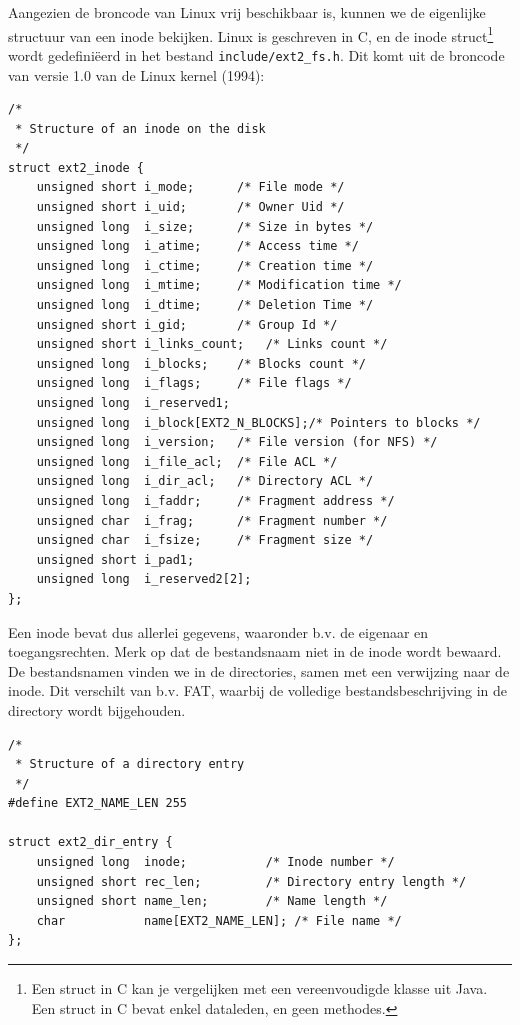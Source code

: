 Aangezien de broncode van Linux vrij beschikbaar is, kunnen we de eigenlijke structuur van een inode
bekijken. Linux is geschreven in C, en de inode struct\footnote{Een struct in C kan je vergelijken
met een vereenvoudigde klasse uit Java. Een struct in C bevat enkel dataleden, en geen methodes.}
wordt gedefini\"eerd in het bestand \verb|include/ext2_fs.h|. Dit komt uit de broncode van versie 1.0
van de Linux kernel (1994):

\begin{verbatim}
/*
 * Structure of an inode on the disk
 */
struct ext2_inode {
    unsigned short i_mode;      /* File mode */
    unsigned short i_uid;       /* Owner Uid */
    unsigned long  i_size;      /* Size in bytes */
    unsigned long  i_atime;     /* Access time */
    unsigned long  i_ctime;     /* Creation time */
    unsigned long  i_mtime;     /* Modification time */
    unsigned long  i_dtime;     /* Deletion Time */
    unsigned short i_gid;       /* Group Id */
    unsigned short i_links_count;   /* Links count */
    unsigned long  i_blocks;    /* Blocks count */
    unsigned long  i_flags;     /* File flags */
    unsigned long  i_reserved1;
    unsigned long  i_block[EXT2_N_BLOCKS];/* Pointers to blocks */
    unsigned long  i_version;   /* File version (for NFS) */
    unsigned long  i_file_acl;  /* File ACL */
    unsigned long  i_dir_acl;   /* Directory ACL */
    unsigned long  i_faddr;     /* Fragment address */
    unsigned char  i_frag;      /* Fragment number */
    unsigned char  i_fsize;     /* Fragment size */
    unsigned short i_pad1;
    unsigned long  i_reserved2[2];
};
\end{verbatim}

Een inode bevat dus allerlei gegevens, waaronder b.v. de eigenaar en toegangsrechten. Merk op
dat de bestandsnaam niet in de inode wordt bewaard. De bestandsnamen vinden we in de directories,
samen met een verwijzing naar de inode. Dit verschilt van b.v. FAT, waarbij de volledige
bestandsbeschrijving in de directory wordt bijgehouden.

\begin{verbatim}
/*
 * Structure of a directory entry
 */
#define EXT2_NAME_LEN 255

struct ext2_dir_entry {
    unsigned long  inode;           /* Inode number */
    unsigned short rec_len;         /* Directory entry length */
    unsigned short name_len;        /* Name length */
    char           name[EXT2_NAME_LEN]; /* File name */
};
\end{verbatim}

